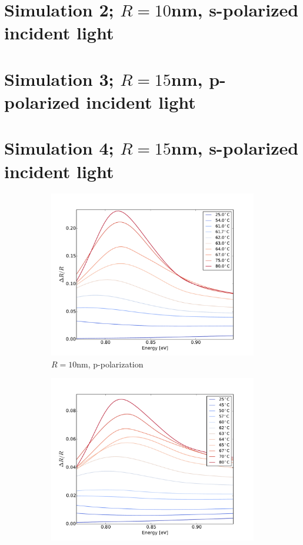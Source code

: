 \section{Simulation 2; $R = 10$nm, s-polarized incident light}
\section{Simulation 3; $R = 15$nm, p-polarized incident light}
\section{Simulation 4; $R = 15$nm, s-polarized incident light}
\begin{figure}
    \centering
    \begin{subfigure}[b]{0.49\textwidth}
        \centering
        \includegraphics[width=\textwidth]{Results/Sim1/dR_lowE.pdf}
        \caption{$R=10$nm, p-polarization}
        \label{fig:y equals x}
    \end{subfigure}
    \begin{subfigure}[b]{0.49\textwidth}
        \centering
        \includegraphics[width=\textwidth]{Results/Sim2/dR_lowE.pdf}

\end{subfigure}
\end{figure}
